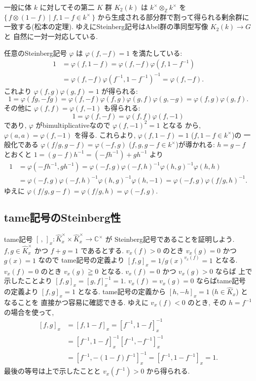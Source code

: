 \documentclass[12pt,twoside]{jarticle}
\newcommand\Z{{\mathbb Z}} %
\newcommand\C{{\mathbb C}} %
\theoremstyle{definition} %
\theoremstyle{definition} %
\theoremstyle{definition} %
\numberwithin{theorem}{section}
\numberwithin{equation}{section}
\numberwithin{figure}{section}
\numberwithin{table}{section}
\newcommand\Khat{{\widehat K}}
\newcommand\tame[3]{\left[#2,#3\right]_{#1}}
\begin{document}
一般に体 $k$ に対してその第二 $K$ 群 $K_2(k)$ は
$k^\times\otimes_\Z k^\times$ を $\{\,f\otimes(1-f)\mid f,1-f\in k^\times\,\}$
から生成される部分群で割って得られる剰余群に一致する(松本の定理).
ゆえにSteinberg記号はAbel群の準同型写像 $K_2(k)\to G$ と
自然に一対一対応している.

任意のSteinberg記号 $\varphi$ は $\varphi(f,-f)=1$ を満たしている:
\begin{align*}
1
&
=\varphi(f,1-f)
=\varphi(f,-f)\varphi(f,1-f^{-1})
\\ &
=\varphi(f,-f)\varphi(f^{-1},1-f^{-1})^{-1}
=\varphi(f,-f).
\end{align*}
これより $\varphi(f,g)\varphi(g,f)=1$ が得られる:
\[
1
=\varphi(fg,-fg)
=\varphi(f,-f)\varphi(f,g)\varphi(g,f)\varphi(g,-g)
=\varphi(f,g)\varphi(g,f).
\]
その他に $\varphi(f,f)=\varphi(f,-1)$ も得られる:
\[
1=\varphi(f,-f)=\varphi(f,f)\varphi(f,-1)
\]
であり, $\varphi$ がbimultiplicativeなので $\varphi(f,-1)^2=1$ となる
から, $\varphi(a,a)=\varphi(f,-1)$ を得る.
これらより, $\varphi(f,1-f)=1$ ($f,1-f\in k^\times$)の
一般化である $\varphi(f/g,g-f)=\varphi(-f,g)$ ($f,g,g-f\in k^\times$)が導かれる:
$h=g-f$ とおくと $1=(g-f)h^{-1}=(-fh^{-1})+gh^{-1}$ より
\begin{align*}
1
&
= \varphi(-fh^{-1}, gh^{-1})
= \varphi(-f,g)\varphi(-f,h)^{-1}\varphi(h,g)^{-1}\varphi(h,h)
\\ &
= \varphi(-f,g)\varphi(-f,h)^{-1}\varphi(h,g)^{-1}\varphi(h,-1)
= \varphi(-f,g)\varphi(f/g,h)^{-1}.
\end{align*}
ゆえに $\varphi(f/g,g-f)=\varphi(f/g,h)=\varphi(-f,g)$.


\subsection{tame記号のSteinberg性}

tame記号 $\tame{x}{\,}{\,}:\Khat_x^\times\times\Khat_x^\times\to\C^\times$ が
Steinberg記号であることを証明しよう.
$f,g\in\Khat_x^\times$ かつ $f+g=1$ であるとする.
$v_x(f)>0$ のとき $v_x(g)=0$ かつ $g(x)=1$ なので
tame記号の定義より $\tame{x}{f}{g}=1/g(x)^{v_x(f)}=1$ となる.
$v_x(f)=0$ のとき $v_x(g)\geqq 0$ となる.
$v_x(f)=0$ かつ $v_x(g)>0$ ならば
上で示したことより $\tame{x}{f}{g}=\tame{x}{g}{f}^{-1}=1$.
$v_x(f)=v_x(g)=0$ ならばtame記号の定義より $\tame{x}{f}{g}=1$ となる.
tame記号の定義から $\tame{x}{h}{-h}=1$ ($h\in\Khat_x$) となることを
直接かつ容易に確認できる. ゆえに $v_x(f)<0$ のとき, その $h=f^{-1}$ の場合を使って,
\begin{align*}
\tame{x}{f}{g}
&
= \tame{x}{f}{1-f}
= \tame{x}{f^{-1}}{1-f}^{-1}
\\ &
= \tame{x}{f^{-1}}{1-f}^{-1} \tame{x}{f^{-1}}{-f^{-1}}^{-1}
\\ &
= \tame{x}{f^{-1}}{-(1-f)f^{-1}}^{-1}
= \tame{x}{f^{-1}}{1-f^{-1}}
= 1.
\end{align*}
最後の等号は上で示したことと $v_x(f^{-1})>0$ から得られる.
\end{document}
